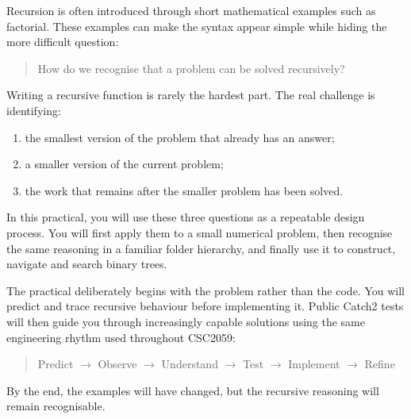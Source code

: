 \documentclass{csc2059practical}
\begin{document}
\maketitle

\tableofcontents
\clearpage



Recursion is often introduced through short mathematical examples such as
factorial. These examples can make the syntax appear simple while hiding the
more difficult question:

\begin{quote}
How do we recognise that a problem can be solved recursively?
\end{quote}

Writing a recursive function is rarely the hardest part. The real challenge is
identifying:

\begin{enumerate}
    \item the smallest version of the problem that already has an answer;
    \item a smaller version of the current problem;
    \item the work that remains after the smaller problem has been solved.
\end{enumerate}

In this practical, you will use these three questions as a repeatable design
process. You will first apply them to a small numerical problem, then recognise
the same reasoning in a familiar folder hierarchy, and finally use it to
construct, navigate and search binary trees.

The practical deliberately begins with the problem rather than the code. You
will predict and trace recursive behaviour before implementing it. Public
Catch2 tests will then guide you through increasingly capable solutions using
the same engineering rhythm used throughout CSC2059:

\begin{quote}
Predict $\rightarrow$ Observe $\rightarrow$ Understand $\rightarrow$ Test
$\rightarrow$ Implement $\rightarrow$ Refine
\end{quote}

By the end, the examples will have changed, but the recursive reasoning will
remain recognisable.
\end{document}
